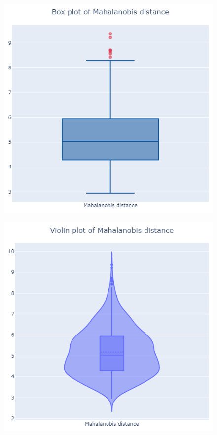 \documentclass[letterpaper]{article}
\begin{document}
	\begin{figure}[h]
		\centering
	\begin{minipage}[c]{0.45\textwidth}
			\includegraphics[width=\textwidth]{images/mahalanobis.png}
			\label{fig:7}
	\end{minipage}
	\begin{minipage}{0.05\textwidth}
		\quad
	\end{minipage}
	\begin{minipage}[c]{0.45\textwidth}
			\includegraphics[width=\textwidth]{images/mahalanobis_violin.png}
			\label{fig:8}
	\end{minipage}
	\end{figure}
\end{document}
